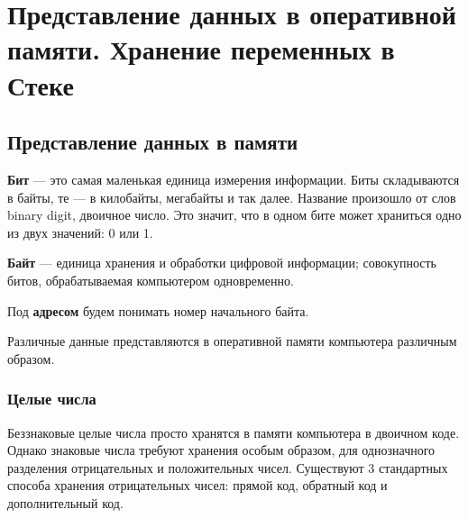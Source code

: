 \section{Представление данных в оперативной памяти. Хранение переменных
в
Стеке}\label{ux43fux440ux435ux434ux441ux442ux430ux432ux43bux435ux43dux438ux435-ux434ux430ux43dux43dux44bux445-ux432-ux43eux43fux435ux440ux430ux442ux438ux432ux43dux43eux439-ux43fux430ux43cux44fux442ux438.-ux445ux440ux430ux43dux435ux43dux438ux435-ux43fux435ux440ux435ux43cux435ux43dux43dux44bux445-ux432-ux441ux442ux435ux43aux435}

\subsection{Представление данных в
памяти}\label{ux43fux440ux435ux434ux441ux442ux430ux432ux43bux435ux43dux438ux435-ux434ux430ux43dux43dux44bux445-ux432-ux43fux430ux43cux44fux442ux438}

\textbf{Бит} --- это самая маленькая единица измерения информации. Биты
складываются в байты, те --- в килобайты, мегабайты и так далее.
Название произошло от слов binary digit, двоичное число. Это значит, что
в одном бите может храниться одно из двух значений: 0 или 1.

\textbf{Байт} --- единица хранения и обработки цифровой информации;
совокупность битов, обрабатываемая компьютером одновременно.

Под \textbf{адресом} будем понимать номер начального байта.

Различные данные представляются в оперативной памяти компьютера
различным образом.

\subsubsection{Целые
числа}\label{ux446ux435ux43bux44bux435-ux447ux438ux441ux43bux430}

Беззнаковые целые числа просто хранятся в памяти компьютера в двоичном
коде. Однако знаковые числа требуют хранения особым образом, для
однозначного разделения отрицательных и положительных чисел. Существуют
3 стандартных способа хранения отрицательных чисел: прямой код, обратный
код и дополнительный код.

